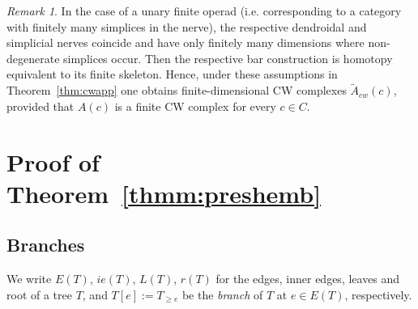 \documentclass{amsart}
\theoremstyle{definition}
\theoremstyle{remark}
\newtheorem{remark}[formula]{Remark}
\begin{document}
	
	\begin{remark}
		In the case of a unary finite operad (i.e. corresponding to a category with finitely many simplices in the nerve), the respective dendroidal and simplicial nerves coincide and have only finitely many dimensions where non-degenerate simplices occur.
		Then the respective bar construction is homotopy equivalent to its finite skeleton.
		Hence, under these assumptions in Theorem~\ref{thm:cwapp} one obtains finite-dimensional CW complexes $\widetilde{A}_{cw}(c)$, provided that $A(c)$ is a finite CW complex for every $c\in C$.
	\end{remark}
	
	\section{Proof of Theorem~\ref{thmm:preshemb}}\label{sec:thm3}

	\subsection{Branches}\label{ssec:branch}

	We write $E(T)$, $ie(T)$, $L(T)$, $r(T)$ for the edges, inner edges, leaves and root of a
	tree $T$, and $T[e]:=T_{\geqslant e}$ be the \textit{branch} of $T$ at $e\in E(T)$, respectively. 
\end{document}
